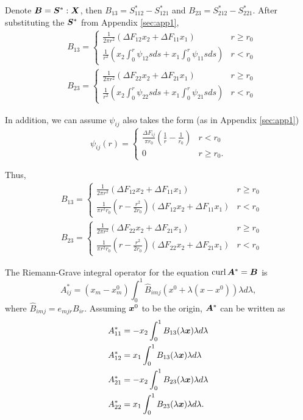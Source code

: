 \documentclass[11pt,letterpaper]{article}
\begin{document}
Denote $\bfB = \bfS^{*} :\bfX$, then $B_{13} = S^{*}_{112}-S^{*}_{121}$ and $B_{23} =S^{*}_{212}-S^{*}_{221}$. After substituting the $\bfS^{*}$ from Appendix \ref{sec:app1}, 
\begin{eqnarray*}
&B_{13} =  
\begin{cases}
\frac{1}{2\pi r^2} (\Delta F_{12}x_2 + \Delta F_{11}x_1) & r \ge r_0 \\
\frac{1}{r^2} (x_2 \int_0^r \psi_{12}sds + x_1 \int_0^r \psi_{11}sds) & r<r_0
\end{cases} \\
&B_{23} = 
\begin{cases}
\frac{1}{2\pi r^2} (\Delta F_{22} x_2 + \Delta F_{21} x_1) & r \ge r_0\\
\frac{1}{r^2} (x_2 \int_0^r \psi_{22}s ds + x_1 \int_0^r \psi_{21} s ds ) & r < r_0
\end{cases}
\end{eqnarray*}

In addition, we can assume $\psi_{ij}$ also takes the form (as in Appendix \ref{sec:app1})
\begin{equation*}
\psi_{ij}(r) = 
\begin{cases}
\frac{\Delta F_{ij}}{\pi r_0} (\frac{1}{r} - \frac{1}{r_0}) & r < r_0 \\
0  & r \ge r_0.
\end{cases}
\end{equation*}

Thus, 
\begin{eqnarray*}
&B_{13} = 
\begin{cases}
\frac{1}{2\pi r^2} (\Delta F_{12} x_2 + \Delta F_{11} x_1) & r \ge r_0 \\
\frac{1}{\pi r^2r_0}(r - \frac{r^2}{2 r_0}) ( \Delta F_{12}x_2 +  \Delta F_{11}x_1) & r <r_0
\end{cases}
\\
&B_{23} = 
\begin{cases}
\frac{1}{2\pi r^2} (\Delta F_{22} x_2 + \Delta F_{21} x_1) & r \ge r_0 \\
\frac{1}{\pi r^2r_0}(r - \frac{r^2}{2 r_0}) (\Delta F_{22}x_2 + \Delta F_{21}x_1) & r <r_0
\end{cases}
\end{eqnarray*}

The Riemann-Grave integral operator for the equation $\curl \bfA^* = \bfB$ is 
\begin{equation*}
A^*_{ij} = (x_m-x^0_m) \int_0^1 \hat{B}_{imj} (x^0 + \lambda(x-x^0))\lambda d\lambda,
\end{equation*}
where $\hat{B}_{imj} = e_{mjr}B_{ir}$. Assuming $\bfx^0$ to be the origin, $\bfA^*$ can be written as 
\begin{eqnarray*}
&A^*_{11} = -x_2 \int_0^1 B_{13}(\lambda \bfx) \lambda d\lambda \\
&A^*_{12} = x_1 \int_0^1 B_{13}(\lambda \bfx) \lambda d\lambda \\
&A^*_{21} = -x_2 \int_0^1 B_{23}(\lambda \bfx) \lambda d\lambda \\
&A^*_{22} = x_1 \int_0^1 B_{23}(\lambda \bfx) \lambda d\lambda.
\end{eqnarray*}
\end{document}
